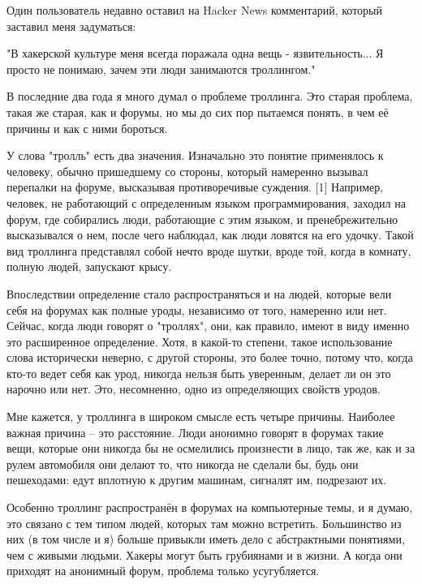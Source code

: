 \documentclass[ebook,12pt,oneside,openany]{memoir}
\begin{document}
\maketitle

Один пользователь недавно оставил на Hacker News комментарий, который
заставил меня задуматься:

"В хакерской культуре меня всегда поражала одна вещь -
язвительность... Я просто не понимаю, зачем эти люди занимаются
троллингом."

В последние два года я много думал о проблеме троллинга. Это старая
проблема, такая же старая, как и форумы, но мы до сих пор пытаемся
понять, в чем её причины и как с ними бороться.

У слова "тролль" есть два значения. Изначально это понятие применялось
к человеку, обычно пришедшему со стороны, который намеренно вызывал
перепалки на форуме, высказывая противоречивые суждения. [1] Например,
человек, не работающий с определенным языком программирования, заходил
на форум, где собирались люди, работающие с этим языком, и
пренебрежительно высказывался о нем, после чего наблюдал, как люди
ловятся на его удочку. Такой вид троллинга представлял собой нечто
вроде шутки, вроде той, когда в комнату, полную людей, запускают
крысу.

Впоследствии определение стало распространяться и на людей, которые
вели себя на форумах как полные уроды, независимо от того, намеренно
или нет. Сейчас, когда люди говорят о "троллях", они, как правило,
имеют в виду именно это расширенное определение. Хотя, в какой-то
степени, такое использование слова исторически неверно, с другой
стороны, это более точно, потому что, когда кто-то ведет себя как
урод, никогда нельзя быть уверенным, делает ли он это нарочно или нет.
Это, несомненно, одно из определяющих свойств уродов.

Мне кажется, у троллинга в широком смысле есть четыре причины.
Наиболее важная причина -- это расстояние. Люди анонимно говорят в
форумах такие вещи, которые они никогда бы не осмелились произнести в
лицо, так же, как и за рулем автомобиля они делают то, что никогда не
сделали бы, будь они пешеходами: едут вплотную к другим машинам,
сигналят им, подрезают их.

Особенно троллинг распространён в форумах на компьютерные темы, и я
думаю, это связано с тем типом людей, которых там можно встретить.
Большинство из них (в том числе и я) больше привыкли иметь дело с
абстрактными понятиями, чем с живыми людьми. Хакеры могут быть
грубиянами и в жизни. А когда они приходят на анонимный форум,
проблема только усугубляется.
\end{document}
